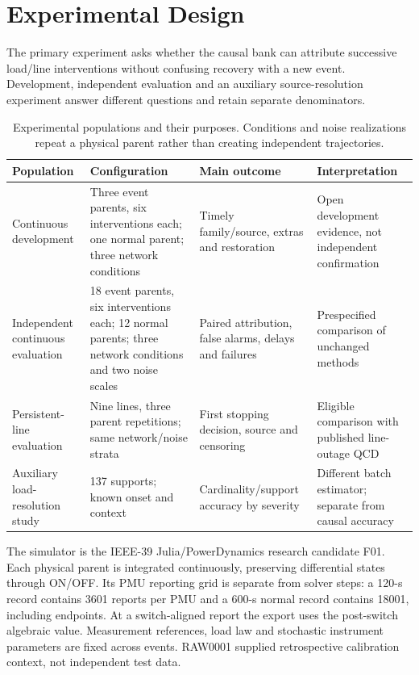 \section{Experimental Design}
\label{sec:narrative-protocol}

The primary experiment asks whether the causal bank can attribute successive load/line interventions without confusing recovery with a new event. Development, independent evaluation and an auxiliary source-resolution experiment answer different questions and retain separate denominators.

\begin{table}[t]\centering\small
\caption{Experimental populations and their purposes. Conditions and noise realizations repeat a physical parent rather than creating independent trajectories.}\label{tab:narrative-evidence}
\begin{tabularx}{\textwidth}{@{}lXXX@{}}\toprule
Population & Configuration & Main outcome & Interpretation\\\midrule
Continuous development & Three event parents, six interventions each; one normal parent; three network conditions & Timely family/source, extras and restoration & Open development evidence, not independent confirmation\\
Independent continuous evaluation & 18 event parents, six interventions each; 12 normal parents; three network conditions and two noise scales & Paired attribution, false alarms, delays and failures & Prespecified comparison of unchanged methods\\
Persistent-line evaluation & Nine lines, three parent repetitions; same network/noise strata & First stopping decision, source and censoring & Eligible comparison with published line-outage QCD\\
Auxiliary load-resolution study & 137 supports; known onset and context & Cardinality/support accuracy by severity & Different batch estimator; separate from causal accuracy\\\bottomrule
\end{tabularx}\end{table}

The simulator is the IEEE-39 Julia/PowerDynamics research candidate F01. Each physical parent is integrated continuously, preserving differential states through ON/OFF. Its PMU reporting grid is separate from solver steps: a 120-s record contains 3601 reports per PMU and a 600-s normal record contains 18001, including endpoints. At a switch-aligned report the export uses the post-switch algebraic value. Measurement references, load law and stochastic instrument parameters are fixed across events. RAW0001 supplied retrospective calibration context, not independent test data.

